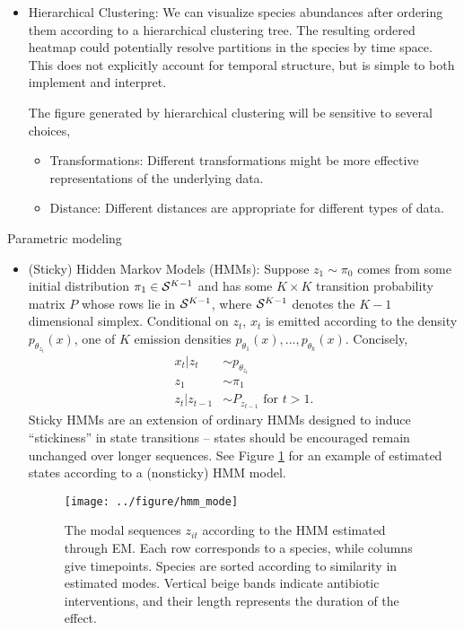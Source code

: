 \documentclass[final, 8pt]{beamer}
\newlength{\onecolwid}
\begin{document}
\begin{frame}
\begin{columns}
\begin{column}{\onecolwid}
  \begin{block}{}
\begin{itemize}
\item Hierarchical Clustering: 
We can visualize species abundances after ordering them according to a
hierarchical clustering tree. The resulting ordered heatmap could potentially
resolve partitions in the species by time space. This does not explicitly
account for temporal structure, but is simple to both implement and interpret.

The figure generated by hierarchical clustering will be sensitive to several
choices,
\begin{itemize}
\item Transformations: Different transformations might be more effective
  representations of the underlying data.
\item Distance: Different distances are appropriate for different types of data.
\end{itemize}
\end{itemize}
\end{block}

\begin{block}{Parametric modeling}
\begin{itemize}
\item (Sticky) Hidden Markov Models (HMMs): Suppose $z_{1} \sim \pi_{0}$ comes
  from some initial distribution $\pi_{1} \in \mathcal{S}^{K - 1}$ and has some $K
  \times K$ transition probability matrix $P$ whose rows lie in $\mathcal{S}^{K -
    1}$, where $\mathcal{S}^{K - 1}$ denotes the $K - 1$ dimensional simplex.
  Conditional on $z_{t}$, $x_{t}$ is emitted according to the density
  $p_{\theta_{z_{t}}}\left(x\right)$, one of $K$ emission densities
  $p_{\theta_{1}}\left(x\right), \dots, p_{\theta_{k}}\left(x\right)$.
  Concisely,
\begin{align*}
  x_{t} \vert z_{t} &\sim p_{\theta_{z_{t}}} \\ z_{1} &\sim \pi_{1} \\ z_{t}
  \vert z_{t - 1} &\sim P_{z_{t - 1}} \text{ for } t > 1.
\end{align*}
Sticky HMMs are an extension of ordinary HMMs designed to induce ``stickiness''
in state transitions -- states should be encouraged remain unchanged over longer
sequences. See Figure \ref{fig:hmm_mode} for an example of estimated states
according to a (nonsticky) HMM model.
\begin{figure}[ht]
  \centering
  \texttt{[image: ../figure/hmm\_mode]}
  \caption{The modal sequences $z_{it}$ according to the HMM estimated through
    EM. Each row corresponds to a species, while columns give timepoints.
    Species are sorted according to similarity in estimated modes. Vertical
    beige bands indicate antibiotic interventions, and their length represents
    the duration of the effect.\label{fig:hmm_mode} }
\end{figure}


\end{itemize}
\end{block}
\end{column}
\end{columns}
\end{frame}
\end{document}
